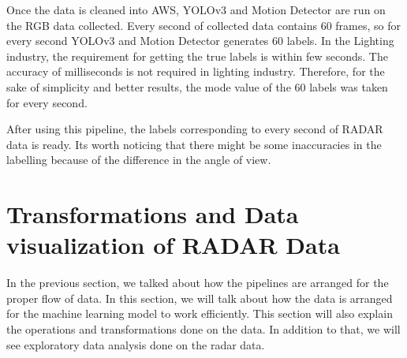 Once the data is cleaned into AWS, YOLOv3 and  Motion Detector are run on the RGB data collected. Every second of collected data contains 60 frames, so for every second YOLOv3 and Motion Detector generates 60 labels. In the Lighting industry, the requirement for getting the true labels is within few seconds. The accuracy of milliseconds is not required in lighting industry. Therefore, for the sake of simplicity and better results, the mode value of the 60 labels was taken for every second. 

After using this pipeline, the labels corresponding to every second of RADAR data is ready. Its worth noticing that there might be some inaccuracies in the labelling because of the difference in the angle of view. 

\section{Transformations and Data visualization of RADAR Data}

In the previous section, we talked about how the pipelines are arranged for the proper flow of data. In this section, we will talk about how the data is arranged for the machine learning model to work efficiently. This section will also explain the operations and transformations done on the data. In addition to that, we will see exploratory data analysis done on the radar data.

